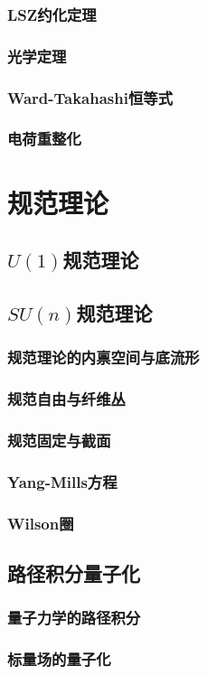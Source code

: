 \documentclass{book}
\begin{document}
\section{LSZ约化定理}
\section{光学定理}
\section{Ward-Takahashi恒等式}
\section{电荷重整化}
\part{规范理论}
\chapter{$U(1)$规范理论}
\chapter{$SU(n)$规范理论}
\section{规范理论的内禀空间与底流形}
\section{规范自由与纤维丛}
\section{规范固定与截面}
\section{Yang-Mills方程}
\section{Wilson圈}
\chapter{路径积分量子化}
\section{量子力学的路径积分}
\section{标量场的量子化}
\end{document}

